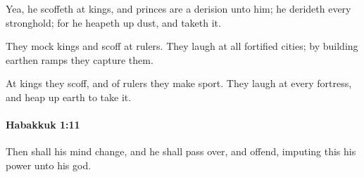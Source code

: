 			\begin{versebox}
					\item[BHS] 
					\item[LXX] 
					\item[ASV] Yea, he scoffeth at kings, and princes are a derision unto him; he derideth every stronghold; for he heapeth up dust, and taketh it.
					\item[NIV] They mock kings and scoff at rulers. They laugh at all fortified cities; by building earthen ramps they capture them.
					\item[NRSV] At kings they scoff, and of rulers they make sport. They laugh at every fortress, and heap up earth to take it.
			\end{versebox}

		\paragraph{Habakkuk 1:11} %
			\label{HABAKKUK-1-11}

			Then shall his mind change, and he shall pass over, and offend, imputing this his power unto his god.

